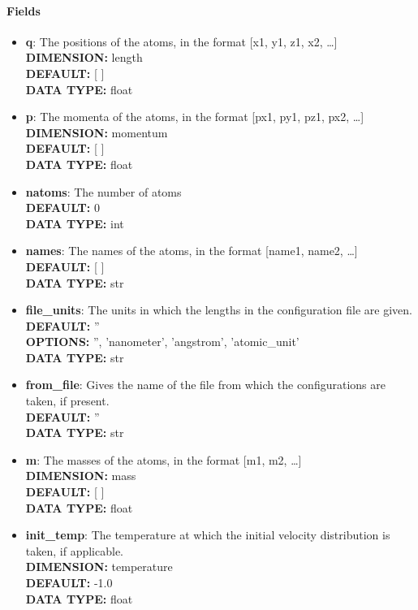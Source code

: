 \begin{itemize}
\paragraph{Fields}
 \begin{itemize}
\item {\bf q}:
 The positions of the atoms, in the format [x1, y1, z1, x2, \ldots  ]
{\\ \bf DIMENSION: }length
{\\ \bf DEFAULT: }[ ]
{\\ \bf DATA TYPE: }float
\item {\bf p}:
 The momenta of the atoms, in the format [px1, py1, pz1, px2, \ldots  ]
{\\ \bf DIMENSION: }momentum
{\\ \bf DEFAULT: }[ ]
{\\ \bf DATA TYPE: }float
\item {\bf natoms}:
 The number of atoms
{\\ \bf DEFAULT: }0
{\\ \bf DATA TYPE: }int
\item {\bf names}:
 The names of the atoms, in the format [name1, name2, \ldots  ]
{\\ \bf DEFAULT: }[ ]
{\\ \bf DATA TYPE: }str
\item {\bf file\_units}:
 The units in which the lengths in the configuration file are given.
{\\ \bf DEFAULT: }''
{\\ \bf OPTIONS: }'', 'nanometer', 'angstrom', 'atomic\_unit'
{\\ \bf DATA TYPE: }str
\item {\bf from\_file}:
 Gives the name of the file from which the configurations are taken, if present.
{\\ \bf DEFAULT: }''
{\\ \bf DATA TYPE: }str
\item {\bf m}:
 The masses of the atoms, in the format [m1, m2, \ldots  ]
{\\ \bf DIMENSION: }mass
{\\ \bf DEFAULT: }[ ]
{\\ \bf DATA TYPE: }float
\item {\bf init\_temp}:
 The temperature at which the initial velocity distribution is taken, if applicable.
{\\ \bf DIMENSION: }temperature
{\\ \bf DEFAULT: }-1.0
{\\ \bf DATA TYPE: }float
\end{itemize}
 

\end{itemize}
